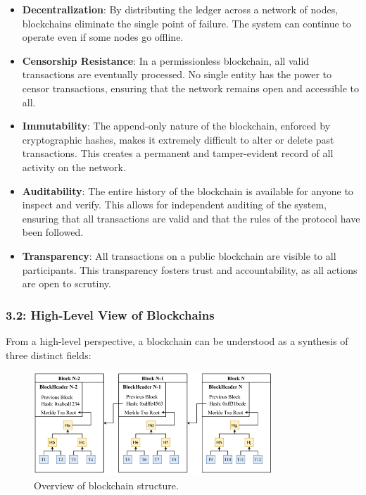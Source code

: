 \begin{itemize}
	\tightlist
	\item
	\textbf{Decentralization}: By distributing the ledger across a network
	of nodes, blockchains eliminate the single point of failure. The
	system can continue to operate even if some nodes go offline.
	\item
	\textbf{Censorship Resistance}: In a permissionless blockchain, all
	valid transactions are eventually processed. No single entity has the
	power to censor transactions, ensuring that the network remains open
	and accessible to all.
	\item
	\textbf{Immutability}: The append-only nature of the blockchain,
	enforced by cryptographic hashes, makes it extremely difficult to
	alter or delete past transactions. This creates a permanent and
	tamper-evident record of all activity on the network.
	\item
	\textbf{Auditability}: The entire history of the blockchain is
	available for anyone to inspect and verify. This allows for
	independent auditing of the system, ensuring that all transactions are
	valid and that the rules of the protocol have been followed.
	\item
	\textbf{Transparency}: All transactions on a public blockchain are
	visible to all participants. This transparency fosters trust and
	accountability, as all actions are open to scrutiny.
\end{itemize}

\subsubsection{3.2: High-Level View of
	Blockchains}\label{high-level-view-of-blockchains}

From a high-level perspective, a blockchain can be understood as a
synthesis of three distinct fields:

\begin{figure}[t]
	\begin{center}
		\includegraphics[width=0.8\textwidth]{./figs/blockchain-overview.png} 
		\caption{Overview of blockchain structure.}		
		\label{fig:overview-blockchain}
	\end{center}	
\end{figure}

